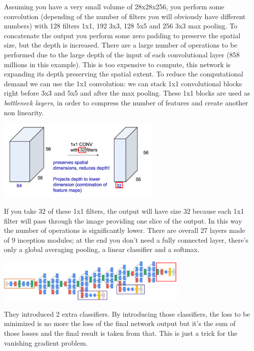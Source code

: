 Assuming you have a very small volume of 28x28x256, you perform some convolution (depending of the number of filters you will obviously have different numbers) with 128 filters 1x1, 192 3x3, 128 5x5 and 256 3x3 max pooling. To concatenate the output you perform some zero padding to preserve the spatial size, but the depth is increased. There are a large number of operations to be performed due to the large depth of the input of each convolutional layer (858 millions in this example). This is too expensive to compute, this network is expanding its depth preserving the spatial extent. To reduce the computational demand we can use the 1x1 convolution: we can stack 1x1 convolutional blocks right before 3x3 and 5x5 and after the max pooling. These 1x1 blocks are used as \textit{bottleneck layers}, in order to compress the number of features and create another non linearity. 
\begin{center}
    \includegraphics[width=0.6\textwidth]{images/1x1conb.PNG}\par
\end{center}
If you take 32 of these 1x1 filters, the output will have size 32 because each 1x1 filter will pass through the image providing one slice of the output. In this way the number of operations is significantly lower. There are overall 27 layers made of 9 inception modules; at the end you don't need a fully connected layer, there's only a global averaging pooling, a linear classifier and a softmax.
\begin{center}
    \includegraphics[width=0.7\textwidth]{images/incgoogle.PNG}\par
\end{center}
They introduced 2 extra classifiers. By introducing those classifiers, the loss to be minimized is no more the loss of the final network output but it's the sum of those losses and the final result is taken from that. This is just a trick for the vanishing gradient problem. 

